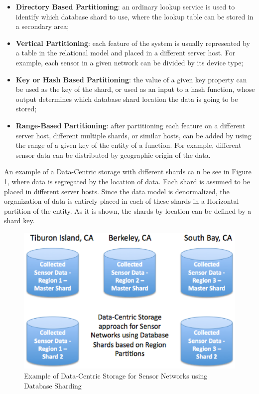 \begin{itemize}
  \item \textbf{Directory Based Partitioning}: an ordinary lookup service is
  used to identify which database shard to use, where the lookup table can be
  stored in a secondary area;
  \item \textbf{Vertical Partitioning}: each feature of the system is usually
  represented by a table in the relational model and placed in a different
  server host. For example, each sensor in a given network can be divided by
  its device type;
  \item \textbf{Key or Hash Based Partitioning}: the value of a given key
  property can  be used as the key of the shard, or used as an input to a hash
  function, whose output determines which database shard location the data is
  going to  be stored;
  \item \textbf{Range-Based Partitioning}: after partitioning each feature on
  a different  server host, different multiple shards, or similar hosts, can be
  added by using  the range of a given key of the entity of a function. For
  example, different  sensor data can be distributed by geographic origin of
  the data.
\end{itemize}

An example of a Data-Centric storage with different shards
\cite{db-shard-intro} ca n be see in Figure
\ref{fig:database-sharding-by-region}, where data is segregated by the
location of data. Each shard is assumed to be placed in different server
hosts. Since the data model is denormalized, the organization of data is
entirely placed in each of these shards in a Horizontal partition of the
entity. As it is shown, the shards by location can be defined by a shard key.

\begin{figure}
  \centering
  \includegraphics[scale=0.65]{../diagrams/database-sharding-by-region}
  \caption{Example of Data-Centric Storage for Sensor Networks using Database
  Sharding}
  \label{fig:database-sharding-by-region}
\end{figure}

